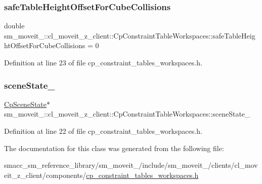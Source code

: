 \subsubsection{\texorpdfstring{safe\+Table\+Height\+Offset\+For\+Cube\+Collisions}{safeTableHeightOffsetForCubeCollisions}}
{\footnotesize\ttfamily double sm\+\_\+moveit\+\_\+::cl\+\_\+moveit\+\_\+z\+\_\+client\+::\+Cp\+Constraint\+Table\+Workspaces\+::safe\+Table\+Height\+Offset\+For\+Cube\+Collisions = 0\hspace{0.3cm}{\ttfamily [private]}}



Definition at line 23 of file cp\+\_\+constraint\+\_\+tables\+\_\+workspaces.\+h.

\mbox{\label{classsm__moveit__4_1_1cl__moveit__z__client_1_1CpConstraintTableWorkspaces_ae2d0e4852e944e8a870d5936de646d47}} 
\subsubsection{\texorpdfstring{scene\+State\+\_\+}{sceneState\_}}
{\footnotesize\ttfamily \hyperlink{classsm__moveit__4_1_1cl__perception__system_1_1CpSceneState}{Cp\+Scene\+State}$\ast$ sm\+\_\+moveit\+\_\+::cl\+\_\+moveit\+\_\+z\+\_\+client\+::\+Cp\+Constraint\+Table\+Workspaces\+::scene\+State\+\_\+\hspace{0.3cm}{\ttfamily [private]}}



Definition at line 22 of file cp\+\_\+constraint\+\_\+tables\+\_\+workspaces.\+h.



The documentation for this class was generated from the following file\+:\begin{DoxyCompactItemize}
\item 
smacc\+\_\+sm\+\_\+reference\+\_\+library/sm\+\_\+moveit\+\_/include/sm\+\_\+moveit\+\_/clients/cl\+\_\+moveit\+\_\+z\+\_\+client/components/\hyperlink{cp__constraint__tables__workspaces_8h}{cp\+\_\+constraint\+\_\+tables\+\_\+workspaces.\+h}\end{DoxyCompactItemize}
